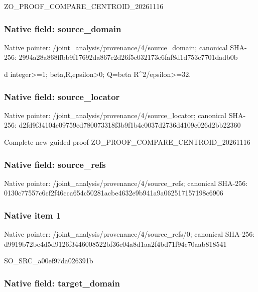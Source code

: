 \documentclass[10pt,a4paper]{article}
\begin{document}
ZO\_PROOF\_COMPARE\_CENTROID\_20261116


\subsubsection{Native field: source\_domain}


Native pointer: /joint\_analysis/provenan\allowbreak{}ce/4/source\_domain; canonical SHA-256: 2994a28a868ffbb9f17692da\allowbreak{}867c2d26f5c032173e6faf8d\allowbreak{}1d753c7701dadb0b


d integer>=1; beta,R,epsilon>0; Q=beta R\textasciicircum{}2/epsilon>=32.


\subsubsection{Native field: source\_locator}


Native pointer: /joint\_analysis/provenan\allowbreak{}ce/4/source\_locator; canonical SHA-256: d2fd9f34104e09759ed78007\allowbreak{}3318f3b9f1b4e0037d2736d4\allowbreak{}109c026d2bb22360


Complete new guided proof ZO\_PROOF\_COMPARE\_CENTROID\_20261116


\subsubsection{Native field: source\_refs}


Native pointer: /joint\_analysis/provenan\allowbreak{}ce/4/source\_refs; canonical SHA-256: 0130c77557c6cf2f46cca654\allowbreak{}c50281acbe4632e9b941a9a0\allowbreak{}62517157198c6906



\subsubsection{Native item 1}


Native pointer: /joint\_analysis/provenan\allowbreak{}ce/4/source\_refs/0; canonical SHA-256: d9919b72be4d5d9126f34460\allowbreak{}08522bf36e04a8d1aa2f4bd7\allowbreak{}1f94c70aab818541


SO\_SRC\_a00ef97da026391b


\subsubsection{Native field: target\_domain}
\end{document}
